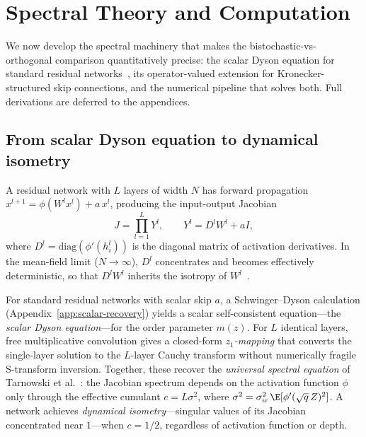 
\section{Spectral Theory and Computation}\label{sec:spectral-theory}

We now develop the spectral machinery that makes the bistochastic-vs-orthogonal comparison quantitatively precise: the scalar Dyson equation for standard residual networks~\cite{tarnowski2019dynamical}, its operator-valued extension for Kronecker-structured skip connections, and the numerical pipeline that solves both. Full derivations are deferred to the appendices.

\subsection{From scalar Dyson equation to dynamical isometry}\label{sec:dyson-resnet}

A residual network with $L$ layers of width $N$ has forward propagation $x^{l+1} = \phi(W^l x^l) + a\, x^l$, producing the input-output Jacobian
\begin{equation}\label{eq:jacobian}
J = \prod_{l=1}^{L} Y^l, \qquad Y^l = D^l W^l + aI,
\end{equation}
where $D^l = \mathrm{diag}(\phi'(h^l_i))$ is the diagonal matrix of activation derivatives. In the mean-field limit ($N \to \infty$), $D^l$ concentrates and becomes effectively deterministic, so that $D^l W^l$ inherits the isotropy of $W^l$~\cite{pennington2017resurrecting}.

For standard residual networks with scalar skip $a$, a Schwinger--Dyson calculation (Appendix~\ref{app:scalar-recovery}) yields a scalar self-consistent equation---the \emph{scalar Dyson equation}---for the order parameter $m(z)$. For $L$ identical layers, free multiplicative convolution gives a closed-form \emph{$z_1$-mapping} that converts the single-layer solution to the $L$-layer Cauchy transform without numerically fragile S-transform inversion. Together, these recover the \emph{universal spectral equation} of Tarnowski et al.~\cite{tarnowski2019dynamical}: the Jacobian spectrum depends on the activation function $\phi$ only through the effective cumulant $c = L\sigma^2$, where $\sigma^2 = \sigma_w^2\,\E[\phi'(\sqrt{q}\,Z)^2]$. A network achieves \emph{dynamical isometry}\label{def:dynamical-isometry}---singular values of its Jacobian concentrated near $1$---when $c = 1/2$, regardless of activation function or depth.

